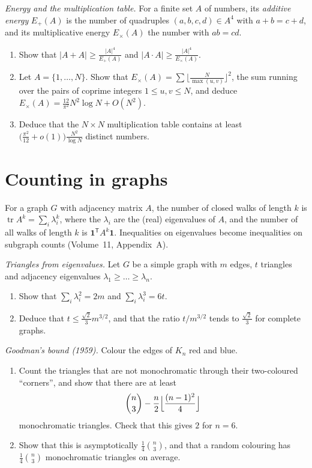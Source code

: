 \begin{exercise}[$\star\star$]\label{pb:energy}
\emph{Energy and the multiplication table.} For a finite set $A$ of numbers, its \emph{additive energy} $E_+(A)$ is the number of
quadruples $(a,b,c,d)\in A^4$ with $a+b=c+d$, and its multiplicative energy $E_\times(A)$ the number with $ab=cd$.
\begin{enumerate}[label=(\alph*)]
\item Show that $|A+A|\ge\frac{|A|^4}{E_+(A)}$ and $|A\cdot A|\ge\frac{|A|^4}{E_\times(A)}$.
\item Let $A=\{1,\dots,N\}$. Show that $E_\times(A)=\sum\bigl\lfloor\frac N{\max(u,v)}\bigr\rfloor^2$, the sum running over the pairs of coprime
integers $1\le u,v\le N$, and deduce $E_\times(A)=\frac{12}{\pi^2}N^2\log N+O(N^2)$.
\item Deduce that the $N\times N$ multiplication table contains at least $\bigl(\frac{\pi^2}{12}+o(1)\bigr)\frac{N^2}{\log N}$ distinct numbers.
\end{enumerate}
\end{exercise}

\section{Counting in graphs}

For a graph $G$ with adjacency matrix $A$, the number of closed walks of length $k$ is $\operatorname{tr}A^k=\sum_i\lambda_i^k$, where the
$\lambda_i$ are the (real) eigenvalues of $A$, and the number of all walks of length $k$ is $\mathbf1^{\mathsf T}A^k\mathbf1$. Inequalities on
eigenvalues become inequalities on subgraph counts (Volume~11, Appendix~A).

\begin{exercise}[$\star\star$]\label{pb:triangleseigen}
\emph{Triangles from eigenvalues.} Let $G$ be a simple graph with $m$ edges, $t$ triangles and adjacency eigenvalues
$\lambda_1\ge\dots\ge\lambda_n$.
\begin{enumerate}[label=(\alph*)]
\item Show that $\sum_i\lambda_i^2=2m$ and $\sum_i\lambda_i^3=6t$.
\item Deduce that $t\le\frac{\sqrt2}3m^{3/2}$, and that the ratio $t/m^{3/2}$ tends to $\frac{\sqrt2}3$ for complete graphs.
\end{enumerate}
\end{exercise}

\begin{exercise}[$\star\star$]\label{pb:goodman}
\emph{Goodman's bound (1959).} Colour the edges of $K_n$ red and blue.
\begin{enumerate}[label=(\alph*)]
\item Count the triangles that are not monochromatic through their two-coloured ``corners'', and show that there are at least
\[
\binom n3-\frac n2\Bigl\lfloor\frac{(n-1)^2}4\Bigr\rfloor
\]
monochromatic triangles. Check that this gives $2$ for $n=6$.
\item Show that this is asymptotically $\frac14\binom n3$, and that a random colouring has $\frac14\binom n3$ monochromatic triangles on average.
\end{enumerate}
\end{exercise}

